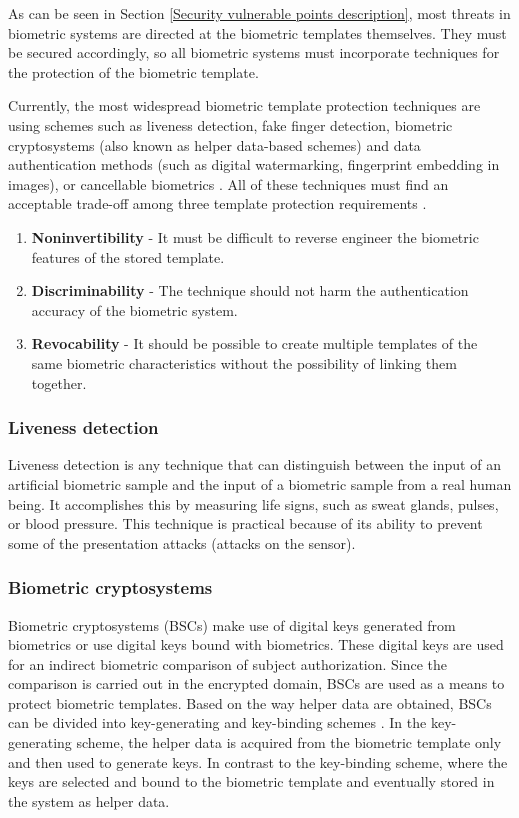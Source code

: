 As can be seen in Section \ref{Security vulnerable points description}, most threats in biometric systems are directed at the biometric templates themselves. They must be secured accordingly, so all biometric systems must incorporate techniques for the protection of the biometric template. 

Currently, the most widespread biometric template protection techniques are using schemes such as liveness detection, fake finger detection, biometric cryptosystems (also known as helper data-based schemes) and data authentication methods (such as digital watermarking, fingerprint embedding in images), or cancellable biometrics \cite{AttacksOnBiometrics}. All of these techniques must find an acceptable trade-off among three template protection requirements \cite{BiometricAuthenticationSystemSecurityAndUserPrivacy}.

\begin{enumerate}
    \item \textbf{Noninvertibility} - It must be difficult to reverse engineer the biometric features of the stored template.
    \item \textbf{Discriminability} - The technique should not harm the authentication accuracy of the biometric system.
    \item \textbf{Revocability} - It should be possible to create multiple templates of the same biometric characteristics without the possibility of linking them together.
\end{enumerate}

\subsubsection{Liveness detection}
Liveness detection is any technique that can distinguish between the input of an artificial biometric sample and the input of a biometric sample from a real human being. It accomplishes this by measuring life signs, such as sweat glands, pulses, or blood pressure. This technique is practical because of its ability to prevent some of the presentation attacks (attacks on the sensor). 

\subsubsection{Biometric cryptosystems}
Biometric cryptosystems (BSCs) make use of digital keys generated from biometrics or use digital keys bound with biometrics. These digital keys are used for an indirect biometric comparison of subject authorization. Since the comparison is carried out in the encrypted domain, BSCs are used as a means to protect biometric templates. Based on the way helper data are obtained, BSCs can be divided into key-generating and key-binding schemes \cite{BiometricCryptosystems}. In the key-generating scheme, the helper data is acquired from the biometric template only and then used to generate keys. In contrast to the key-binding scheme, where the keys are selected and bound to the biometric template and eventually stored in the system as helper data.

